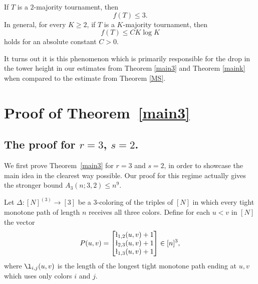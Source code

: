 \begin{theorem} \label{kmaj}
If $T$ is a $2$-majority tournament, then 
$$f(T) \leq 3.$$
In general, for every $K \geq 2$, if $T$ is a $K$-majority tournament, then
$$f(T) \leq C K \log K$$
holds for an absolute constant $C>0$. 
\end{theorem}

It turns out it is this phenomenon which is primarily responsible for the drop in the tower height in our estimates from Theorem \ref{main3} and Theorem \ref{maink} when compared to the estimate from Theorem \ref{MS}. 


\section{Proof of Theorem~\ref{main3}}\label{s3}

\subsection{The proof for $r=3$, $s=2$.}

We first prove Theorem~\ref{main3} for $r=3$ and $s=2$, in order to showcase the main idea in the clearest way possible. Our proof for this regime actually gives the stronger bound $A_3(n;3,2) \leq n^9$.

    Let $\Delta: [N]^{(3)} \to [3]$ be a 3-coloring of the triples of $[N]$ in which every tight monotone path of length $n$ receives all three colors.
    Define for each $u < v$ in $[N]$ the vector
    \begin{equation*}
        P(u,v) = \begin{bmatrix}
            \l_{1,2}(u,v) + 1\\
            \l_{2,3}(u,v) + 1\\
            \l_{1,3}(u,v) + 1
        \end{bmatrix} \in [n]^3,
    \end{equation*}
    where $\l_{i,j}(u,v)$ is the length of the longest tight monotone path ending at $u, v$ which uses only colors $i$ and $j$.
    
